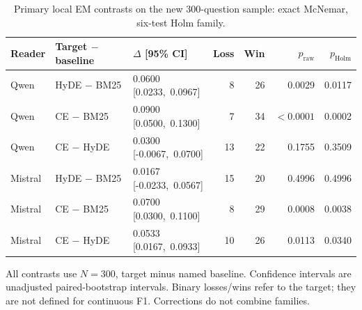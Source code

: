 \begin{table}[htbp]
\centering\footnotesize
\setlength{\tabcolsep}{3pt}
\renewcommand{\arraystretch}{1.08}
\caption{Primary local EM contrasts on the new 300-question sample: exact McNemar, six-test Holm family.}
\label{tab:followup_holdout_em}
\begin{tabularx}{\textwidth}{l l >{\centering\arraybackslash}X r r r r}
\toprule
Reader & Target $-$ baseline & $\Delta$ [95\% CI] & Loss & Win & $p_{\mathrm{raw}}$ & $p_{\mathrm{Holm}}$ \\
\midrule
Qwen & HyDE $-$ BM25 & \shortstack{0.0600\\\mbox{[0.0233, 0.0967]}} & 8 & 26 & 0.0029 & 0.0117 \\
Qwen & CE $-$ BM25 & \shortstack{0.0900\\\mbox{[0.0500, 0.1300]}} & 7 & 34 & $<0.0001$ & 0.0002 \\
Qwen & CE $-$ HyDE & \shortstack{0.0300\\\mbox{[-0.0067, 0.0700]}} & 13 & 22 & 0.1755 & 0.3509 \\
Mistral & HyDE $-$ BM25 & \shortstack{0.0167\\\mbox{[-0.0233, 0.0567]}} & 15 & 20 & 0.4996 & 0.4996 \\
Mistral & CE $-$ BM25 & \shortstack{0.0700\\\mbox{[0.0300, 0.1100]}} & 8 & 29 & 0.0008 & 0.0038 \\
Mistral & CE $-$ HyDE & \shortstack{0.0533\\\mbox{[0.0167, 0.0933]}} & 10 & 26 & 0.0113 & 0.0340 \\
\bottomrule
\end{tabularx}
\begin{tablenotes}\footnotesize
\item All contrasts use $N=300$, target minus named baseline. Confidence intervals are unadjusted paired-bootstrap intervals. Binary losses/wins refer to the target; they are not defined for continuous F1. Corrections do not combine families.
\end{tablenotes}
\end{table}

